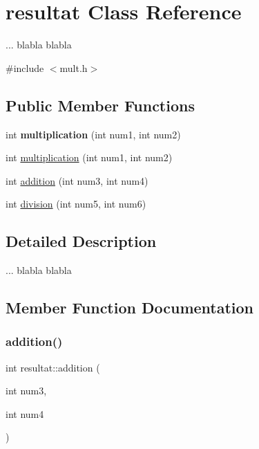 \hypertarget{classresultat}{}\section{resultat Class Reference}
\label{classresultat}


... blabla blabla  




{\ttfamily \#include $<$mult.\+h$>$}

\subsection*{Public Member Functions}
\begin{DoxyCompactItemize}
\item 
\mbox{\label{classresultat_ac3f4984d7c159106135e1af82c9e4556}} 
int {\bfseries multiplication} (int num1, int num2)
\item 
int \hyperlink{classresultat_ac3f4984d7c159106135e1af82c9e4556}{multiplication} (int num1, int num2)
\item 
int \hyperlink{classresultat_a390b2d3477982b10e1b36fc52ba102ea}{addition} (int num3, int num4)
\item 
int \hyperlink{classresultat_ab1dfe27df49fb99860cc7cbf03ad19d9}{division} (int num5, int num6)
\end{DoxyCompactItemize}


\subsection{Detailed Description}
... blabla blabla 

\subsection{Member Function Documentation}
\mbox{\label{classresultat_a390b2d3477982b10e1b36fc52ba102ea}} 
\subsubsection{\texorpdfstring{addition()}{addition()}}
{\footnotesize\ttfamily int resultat\+::addition (\begin{DoxyParamCaption}\item[{int}]{num3,  }\item[{int}]{num4 }\end{DoxyParamCaption})}

